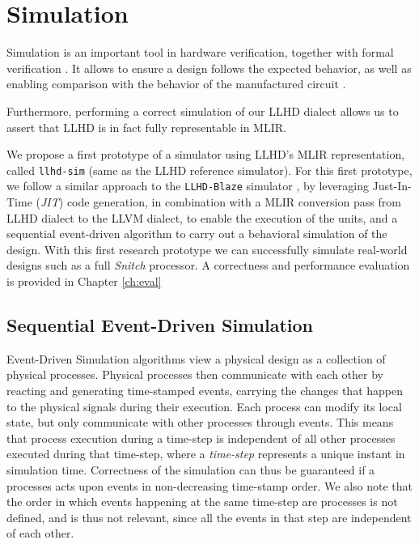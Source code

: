 
\chapter{Simulation}
\label{ch:sim}

Simulation is an important tool in hardware verification, together with formal verification \cite{YuanLu2001, Kumar1998}. It allows to ensure a design follows the expected behavior, as well as enabling comparison with the behavior of the manufactured circuit \cite{Ashenden1994}.

Furthermore, performing a correct simulation of our LLHD dialect allows us to assert that LLHD is in fact fully representable in MLIR.

We propose a first prototype of a simulator using LLHD's MLIR representation, called \texttt{llhd-sim} (same as the LLHD reference simulator). For this first prototype, we follow a similar approach to the \texttt{LLHD-Blaze} simulator \cite{Schuiki2020}, by leveraging Just-In-Time (\textit{JIT}) code generation, in combination with a MLIR conversion pass from LLHD dialect to the LLVM dialect, to enable the execution of the units, and a sequential event-driven algorithm to carry out a behavioral simulation of the design. With this first research prototype we can successfully simulate real-world designs such as a full \textit{Snitch} \cite{Zaruba2020} processor. A correctness and performance evaluation is provided in Chapter \ref{ch:eval}


\section{Sequential Event-Driven Simulation}
Event-Driven Simulation algorithms \cite{Ashenden1994} view a physical design as a collection of physical processes. Physical processes then communicate with each other by reacting and generating time-stamped events, carrying the changes that happen to the physical signals during their execution. Each process can modify its local state, but only communicate with other processes through events. This means that process execution during a time-step is independent of all other processes executed during that time-step, where a \textit{time-step} represents a unique instant in simulation time. Correctness of the simulation can thus be guaranteed if a processes acts upon events in non-decreasing time-stamp order. We also note that the order in which events happening at the same time-step are processes is not defined, and is thus not relevant, since all the events in that step are independent of each other.


